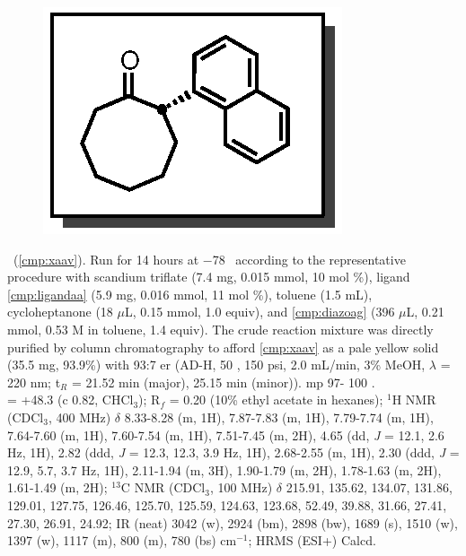 \pagebreak
\begin{figure}
  \vspace{-12pt}
  \begin{center}
    \includegraphics[scale=0.8]{chp_asymmetric/images/xaav}
  \end{center}
  \vspace{-25pt}
\end{figure}\noindent \textbf{\CMPxaav}\ (\ref{cmp:xaav}). Run for 14 hours
at $-$78 \degc\  according to the representative procedure with scandium
triflate (7.4 mg, 0.015 mmol, 10 mol \%), ligand \ref{cmp:ligandaa} (5.9 mg, 0.016
mmol, 11 mol \%), toluene (1.5 mL), cycloheptanone (18 $\mu$L, 0.15 mmol, 1.0
equiv), and \ref{cmp:diazoag} (396 $\mu$L, 0.21 mmol, 0.53 M in toluene, 1.4
equiv). The crude reaction mixture was directly purified by column
chromatography to afford \ref{cmp:xaav} as a pale yellow solid (35.5 mg, 93.9\%)
with 93:7 er (AD-H, 50 \degc, 150 psi, 2.0 mL/min, 3\% MeOH, $\lambda$ = 220 nm;
t$_R$ = 21.52 min (major), 25.15 min (minor)). mp 97- 100 \degc. \\
\rotation = +48.3 (c 0.82, CHCl$_3$); R$_f$ = 0.20 (10\% ethyl acetate in
hexanes); $^1$H NMR (CDCl$_3$, 400 MHz) $\delta$ 8.33-8.28 (m, 1H), 7.87-7.83
(m, 1H), 7.79-7.74 (m, 1H), 7.64-7.60 (m, 1H), 7.60-7.54 (m, 1H), 7.51-7.45 (m,
2H), 4.65 (dd, \textit{J} =  12.1, 2.6 Hz, 1H), 2.82 (ddd, \textit{J} =  12.3,
12.3, 3.9 Hz, 1H), 2.68-2.55 (m, 1H), 2.30 (ddd, \textit{J} =  12.9, 5.7, 3.7
Hz, 1H), 2.11-1.94 (m, 3H), 1.90-1.79 (m, 2H), 1.78-1.63 (m, 2H), 1.61-1.49 (m,
2H); $^{13}$C NMR	(CDCl$_3$,	100	MHz) $\delta$ 215.91,	135.62,	134.07, 131.86,
129.01, 127.75, 126.46, 125.70, 125.59, 124.63, 123.68, 52.49, 39.88, 31.66,
27.41, 27.30, 26.91, 24.92; IR (neat) 3042 (w), 2924 (bm), 2898 (bw), 1689 (s),
1510 (w), 1397 (w), 1117 (m), 800 (m), 780 (bs) cm$^{-1}$; HRMS (ESI+) Calcd.
